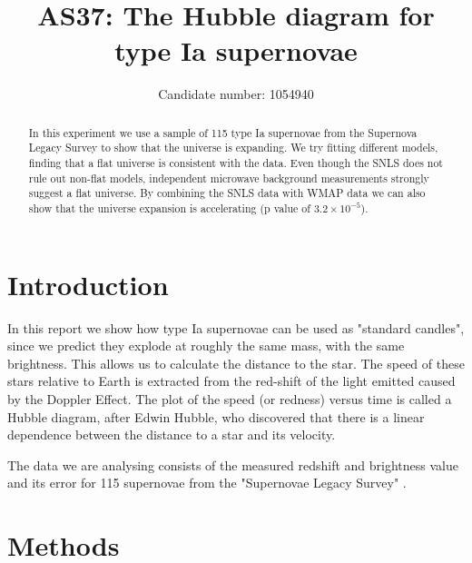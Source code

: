 \documentclass[11pt]{article}
\title{AS37: The Hubble diagram for type Ia supernovae}
\author{Candidate number: 1054940}
\begin{document}
\maketitle


\begin{abstract}
In this experiment we use a sample of 115 type Ia supernovae from the Supernova Legacy Survey to show that the universe is expanding. We try fitting different models, finding that a flat universe is consistent with the data. Even though the SNLS does not rule out non-flat models, independent microwave background measurements strongly suggest a flat universe. By combining the SNLS data with WMAP data we can also show that the universe expansion is accelerating (p value of $3.2 \times 10^{-5}$). 
\end{abstract}


\section{Introduction}
In this report we show how type Ia supernovae can be used as "standard candles", since we predict they explode at roughly the same mass, with the same brightness. This allows us to calculate the distance to the star. The speed of these stars relative to Earth is extracted from the red-shift of the light emitted caused by the Doppler Effect. The plot of the speed (or redness) versus time is called a Hubble diagram, after Edwin Hubble, who discovered that there is a linear dependence between the distance to a star and its velocity. 

The data we are analysing consists of the measured redshift and brightness value and its error for 115 supernovae from the "Supernovae Legacy Survey" \cite{SN_legacy_survey}. 


\section{Methods}
\end{document}
